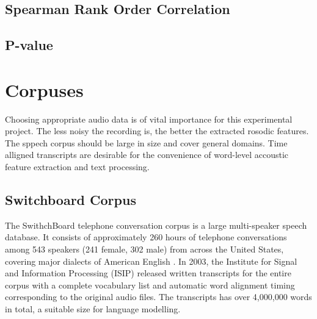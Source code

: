 \subsection{Spearman Rank Order Correlation}

\subsection{P-value}



%
%


\section{Corpuses}
Choosing appropriate audio data is of vital importance for this experimental project. The less noisy the recording is, the better the extracted rosodic features. The sppech corpus should be large in size and cover general domains. Time alligned transcripts are desirable for the convenience of word-level accoustic feature extraction and text processing. 

\subsection{Switchboard Corpus}
The SwithchBoard telephone conversation corpus is a large multi-speaker speech database. It consists of approximately 260 hours of telephone conversations among 543 speakers (241 female, 302 male) from across the United States, covering major dialects of American English\citep{Godfrey1992} . In 2003, the Institute for Signal and Information Processing (ISIP) released written transcripts for the entire corpus with a complete vocabulary list and automatic word alignment timing corresponding to the original audio files. The transcripts has over 4,000,000 words in total, a suitable size for language modelling.


